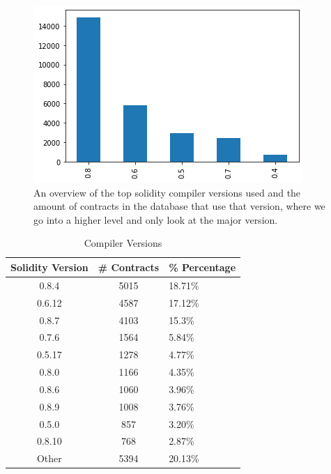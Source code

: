 \documentclass[sigconf]{acmart}
\begin{document}
\begin{figure}[h]
  \centering
  \includegraphics[width=\linewidth]{img/major_versions.png}
  \caption{An overview of the top solidity compiler versions used and the amount of contracts in the database that use that version, where we go into a higher level and only look at the major version. }
  \label{fig:compiler_major}
\end{figure}

\begin{table}
  \caption{Compiler Versions}
  \label{tab:versions}
  \begin{tabular}{ccl}
    \toprule
    Solidity Version & \# Contracts & \% Percentage\\
    \midrule
    0.8.4&5015&18.71\%\\
    0.6.12&4587&17.12\%\\
    0.8.7&4103&15.3\%\\
    0.7.6&1564&5.84\%\\
    0.5.17&1278&4.77\%\\
    0.8.0&1166&4.35\%\\
    0.8.6&1060&3.96\%\\
    0.8.9&1008&3.76\%\\
    0.5.0&857&3.20\%\\
    0.8.10&768&2.87\%\\
    Other&5394&20.13\%\\
  \bottomrule
\end{tabular}
\end{table}
\end{document}
